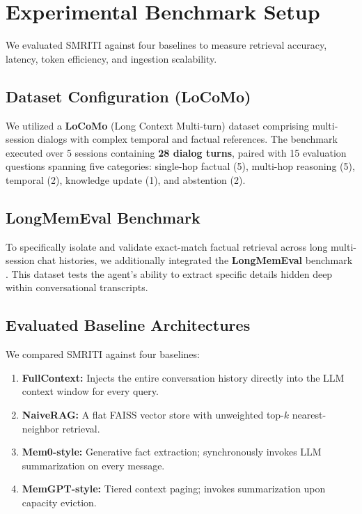 \documentclass[conference]{IEEEtran}
\begin{document}
\section{Experimental Benchmark Setup}

We evaluated SMRITI against four baselines to measure retrieval accuracy, latency, token efficiency, and ingestion scalability.

\subsection{Dataset Configuration (LoCoMo)}
We utilized a \textbf{LoCoMo} (Long Context Multi-turn) dataset \cite{locomo} comprising multi-session dialogs with complex temporal and factual references. The benchmark executed over 5 sessions containing \textbf{28 dialog turns}, paired with 15 evaluation questions spanning five categories: single-hop factual (5), multi-hop reasoning (5), temporal (2), knowledge update (1), and abstention (2).

\subsection{LongMemEval Benchmark}
To specifically isolate and validate exact-match factual retrieval across long multi-session chat histories, we additionally integrated the \textbf{LongMemEval} benchmark \cite{locomo}. This dataset tests the agent's ability to extract specific details hidden deep within conversational transcripts.

\subsection{Evaluated Baseline Architectures}
We compared SMRITI against four baselines:
\begin{enumerate}
    \item \textbf{FullContext:} Injects the entire conversation history directly into the LLM context window for every query.
    \item \textbf{NaiveRAG:} A flat FAISS vector store with unweighted top-$k$ nearest-neighbor retrieval.
    \item \textbf{Mem0-style:} Generative fact extraction; synchronously invokes LLM summarization on every message.
    \item \textbf{MemGPT-style:} Tiered context paging; invokes summarization upon capacity eviction.  
\end{enumerate}
\end{document}
